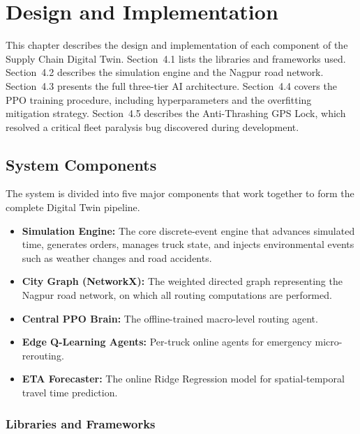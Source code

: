 \chapter{Design and Implementation}

This chapter describes the design and implementation of each component of the
Supply Chain Digital Twin. Section~4.1 lists the libraries and frameworks used.
Section~4.2 describes the simulation engine and the Nagpur road network.
Section~4.3 presents the full three-tier AI architecture. Section~4.4 covers the
PPO training procedure, including hyperparameters and the overfitting mitigation
strategy. Section~4.5 describes the Anti-Thrashing GPS Lock, which resolved a
critical fleet paralysis bug discovered during development.

\section{System Components}

The system is divided into five major components that work together to form the
complete Digital Twin pipeline.

\begin{itemize}
    \item \textbf{Simulation Engine:} The core discrete-event engine that advances
    simulated time, generates orders, manages truck state, and injects environmental
    events such as weather changes and road accidents.
    \item \textbf{City Graph (NetworkX):} The weighted directed graph representing
    the Nagpur road network, on which all routing computations are performed.
    \item \textbf{Central PPO Brain:} The offline-trained macro-level routing agent.
    \item \textbf{Edge Q-Learning Agents:} Per-truck online agents for emergency
    micro-rerouting.
    \item \textbf{ETA Forecaster:} The online Ridge Regression model for
    spatial-temporal travel time prediction.
\end{itemize}

\subsection{Libraries and Frameworks}

